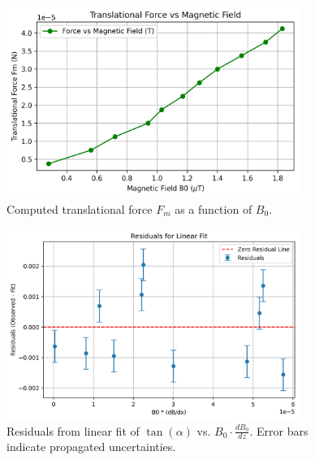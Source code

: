 \begin{figure}[H]
	\centering
	\includegraphics[width=0.85\textwidth]{Assests/Force_vs_Field.png}
	\caption{Computed translational force $F_m$ as a function of $B_0$.}
\end{figure}

\begin{figure}[H]
	\centering
	\includegraphics[width=0.85\textwidth]{Assests/Residuals_Plot.png}
	\caption{Residuals from linear fit of $\tan(\alpha)$ vs. $B_0 \cdot \frac{dB_0}{dz}$. Error bars indicate propagated uncertainties.}
\end{figure}

